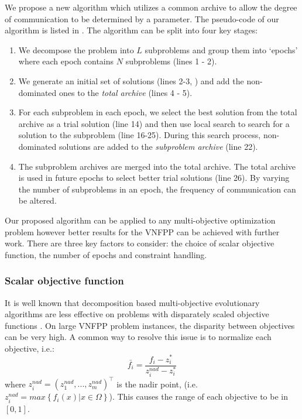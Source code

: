 We propose a new algorithm which utilizes a common archive to allow the degree of communication to be determined by a parameter. The pseudo-code of our algorithm is listed in . The algorithm can be split into four key stages:
\begin{enumerate}
    \item We decompose the problem into $L$ subproblems and group them into `epochs' where each epoch contains $N$ subproblems (lines 1 - 2).
    \item We generate an initial set of solutions (lines 2-3, ) and add the non-dominated ones to the \textit{total archive} (lines 4 - 5).
    \item For each subproblem in each epoch, we select the best solution from the total archive as a trial solution (line 14) and then use local search to search for a solution to the subproblem (line 16-25). During this search process, non-dominated solutions are added to the \textit{subproblem archive} (line 22).
    \item The subproblem archives are merged into the total archive. The total archive is used in future epochs to select better trial solutions (line 26). By varying the number of subproblems in an epoch, the frequency of communication can be altered.
\end{enumerate}

Our proposed algorithm can be applied to any multi-objective optimization problem however better results for the VNFPP can be achieved with further work. There are three key factors to consider: the choice of scalar objective function, the number of epochs and constraint handling. 

\subsubsection{Scalar objective function}
It is well known that decomposition based multi-objective evolutionary algorithms are less effective on problems with disparately scaled objective functions \cite{ZhangL07}. On large VNFPP problem instances, the disparity between objectives can be very high. A common way to resolve this issue is to normalize each objective, i.e.:
\begin{equation}
    \bar{f_i} = \frac{f_i - z^*_i}{z_i^{nad} - z_i^*}
\end{equation}
where $z_i^{nad} = \left(z_1^{nad},...,z_m^{nad}\right)^\intercal$ is the nadir point, (i.e. $z_i^{nad} = max \left\{f_i(x) | x \in \Omega \right\}$). This causes the range of each objective to be in $[0,1]$.

